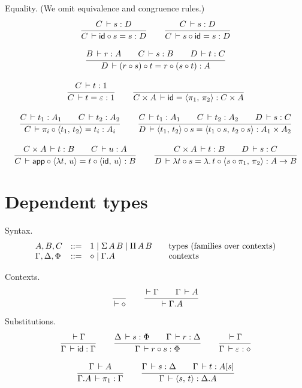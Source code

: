 \documentclass{article}
\newcommand{\pair}[2]{\langle#1,\,#2\rangle}
\newcommand{\eps}{\varepsilon}
\newcommand{\emp}{\eps}
\newcommand{\ty}[1]{\lceil #1 \rceil}
\newcommand{\SigT}[2]{\Sigma\,#1\,#2}
\renewcommand{\PiT}[2]{\Pi\,#1\,#2}
\renewcommand{\cempty}{\diamond}
\begin{document}
Equality.  (We omit equivalence and
congruence rules.)
\begin{gather*}
  \ru{C \der s : D
    }{C \der \tid \comp s = s : D}
\qquad
  \ru{C \der s : D
    }{C \der s \comp \tid = s : D}
\\[2ex]
  \ru{B \der r : A \qquad C \der s : B \qquad D \der t : C
    }{D \der (r \comp s) \comp t = r \comp (s \comp t) : A}
\\[2ex]
  \ru{C \der t : 1
    }{C \der t = \emp : 1}
\qquad
  \ru{
    }{C \times A \der \tid = \pair{\pi_1}{\pi_2} : C \times A}
\\[2ex]
  \ru{C \der t_1 : A_1 \qquad C \der t_2 : A_2
    }{C \der \pi_i \comp \pair{t_1}{t_2} = t_i : A_i}
\qquad
  \ru{C \der t_1 : A_1 \qquad C \der t_2 : A_2 \qquad D \der s : C
    }{D \der \pair{t_1}{t_2} \comp s = \pair{t_1 \comp s}{t_2 \comp s} : A_1 \times A_2}
\\[2ex]
  \ru{C \times A \der t : B \qquad C \der u : A
    }{C \der \tapp \comp \pair{\lambda t}{u} = t \comp \pair{\tid}{u} : B}
\qquad
  \ru{C \times A \der t : B \qquad D \der s : C
    }{D \der \lambda t \comp s = \lambda.\, t \comp \pair{s \comp \pi_1}{\pi_2} : A \to B}
\end{gather*}


\section{Dependent types}

Syntax.
\[
\begin{array}{lrl@{\qquad}l}
  A,B,C & ::= & 1 \mid \SigT A B \mid \PiT A B %
    & \mbox{types (families over contexts)} \\
  \Gamma, \Delta,\Phi & ::= & \cempty \mid \cext \Gamma A
    & \mbox{contexts} \\
\end{array}
\]

Contexts. \fbox{$\der \Gamma$}
\begin{gather*}
  \ru{}{\der \cempty}
\qquad
  \ru{\der \Gamma \qquad
      \Gamma \der A
    }{\der \cext \Gamma A}
\end{gather*}

Substitutions. 
\begin{gather*}
  \ru{\der \Gamma
    }{\Gamma \der \tid : \Gamma}
\qquad
  \ru{\Delta \der s : \Phi \qquad \Gamma \der r : \Delta
    }{\Gamma \der r \comp s : \Phi}
\qquad
  \ru{\der \Gamma
    }{\Gamma \der \emp : \cempty}
\\[2ex]
  \ru{\Gamma \der A
    }{\cext \Gamma A \der \pi_1 : \Gamma}
\qquad
  \ru{\Gamma \der s : \Delta \qquad \Gamma \der t : A[s]
    }{\Gamma \der \pair s t : \cext \Delta A}
\end{gather*}
\end{document}
